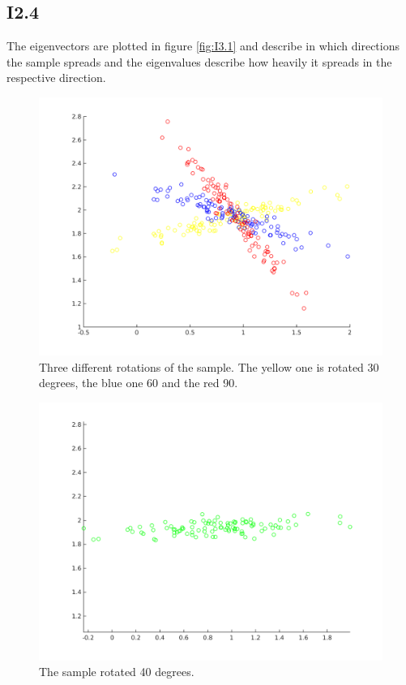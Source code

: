 \documentclass{article}
\begin{document}
\subsection{I2.4}

The eigenvectors are plotted in figure \ref{fig:I3.1} and describe in which
directions the sample spreads and the eigenvalues describe how heavily it
spreads in the respective direction.

\begin{figure}[!ht]
    \centering
    \includegraphics[width=\textwidth]{part1/I241.png}
    \caption{Three different rotations of the sample. The yellow one is
    rotated 30 degrees, the blue one 60 and the red 90.}
    \label{fig:I4.1}
\end{figure}

\begin{figure}[!ht]
    \centering
    \includegraphics[width=\textwidth]{part1/I242.png}
    \caption{The sample rotated 40 degrees.}
    \label{fig:I4.2}
\end{figure}
\end{document}
